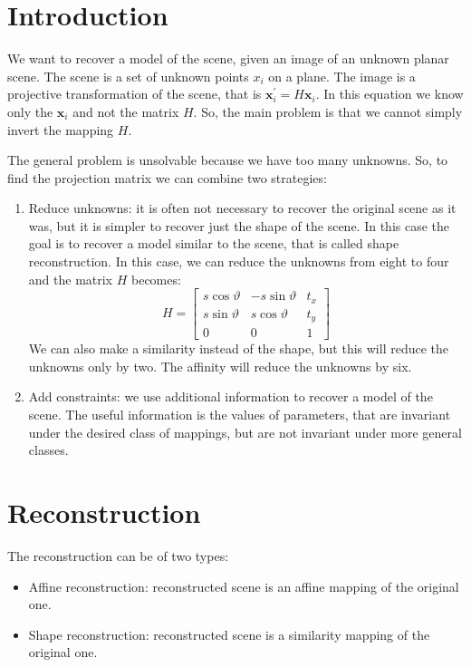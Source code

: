 \documentclass[12pt, a4paper]{report}
\begin{document}
    \section{Introduction}
    We want to recover a model of the scene, given an image of an unknown planar scene. The scene is a set of unknown points $x_i$ on  a 
    plane. The image is a projective transformation of the scene, that is $\boldsymbol{x}_i^{'}=H\boldsymbol{x}_i$. In this equation we
    know only the $\boldsymbol{x}_i$ and not the matrix $H$. So, the main problem is that we cannot simply invert the 
    mapping $H$. 

    The general problem is unsolvable because we have too many unknowns. So, to find the projection matrix we can combine two strategies: 
    \begin{enumerate}
        \item Reduce unknowns: it is often not necessary to recover the original scene as it was, but it is simpler to recover just 
            the shape of the scene. In this case the goal is to recover a model similar to the scene, that is called shape reconstruction. 
            In this case, we can reduce the unknowns from eight to four and the matrix $H$ becomes: 
            \[H=    
            \begin{bmatrix}
                s\cos \vartheta & -s\sin \vartheta & t_x \\
                s\sin \vartheta & s\cos \vartheta & t_y \\
                0 & 0 & 1
            \end{bmatrix}\]
            We can also make a similarity instead of the shape, but this will reduce the unknowns only by two. The affinity will reduce
            the unknowns by six. 
        \item Add constraints: we use additional information to recover a model of the scene. The useful information is the values of
            parameters, that are invariant under the desired class of mappings, but are not invariant under more general classes. 
    \end{enumerate}

    \section{Reconstruction}
    The reconstruction can be of two types: 
    \begin{itemize}
        \item Affine reconstruction: reconstructed scene is an affine mapping of the original one. 
        \item Shape reconstruction: reconstructed scene is a similarity mapping of the original one. 
    \end{itemize}
\end{document}
